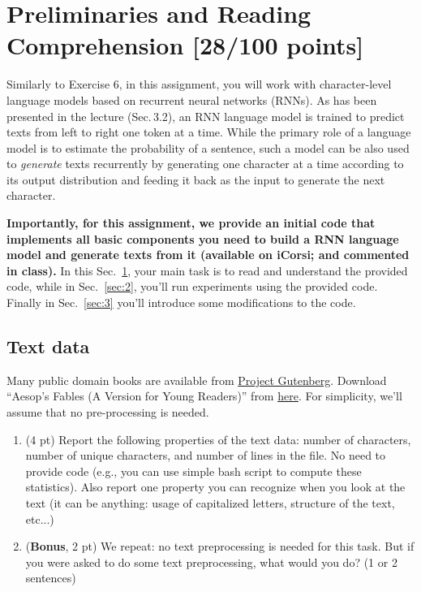 \documentclass[a4paper,11pt]{article}
\begin{document}
\section{Preliminaries and Reading Comprehension [28/100 points]}
\label{sec:1}
Similarly to Exercise 6, in this assignment, you will work with
character-level language models based on recurrent neural networks (RNNs).
As has been presented in the lecture (Sec.\,3.2), an RNN language model is
trained to predict texts from left to right one token at a time.
While the primary role of a language model is to estimate the probability of
a sentence, such a model can be also used to
\textit{generate} texts recurrently by generating one character at a time
according to its output distribution and feeding it back as the input to
generate the next character.

\textbf{Importantly, for this assignment, we provide an initial code that
implements all \mbox{basic} components you need to build a RNN language model and generate texts from it
(available on iCorsi; and commented in class).}
In this Sec.~\ref{sec:1}, your main task is to read and understand the provided code,
while in Sec.~\ref{sec:2}, you'll run experiments using the provided code.
Finally in Sec.~\ref{sec:3} you'll introduce some modifications to the code.

\subsection{Text data}
Many public domain books are available from
\href{http://www.gutenberg.org/}{Project Gutenberg}.
Download ``Aesop's Fables (A Version for Young Readers)''
from \href{http://www.gutenberg.org/files/49010/49010-0.txt}{here}.
For simplicity, we'll assume that no pre-processing is needed.
\begin{enumerate}
 \item (4 pt) Report the following properties of the text data:
 number of characters, number of unique characters, and number of lines in the file. No need to provide code (e.g., you can use simple bash script to compute these statistics).
 Also report one property you can recognize when you look at the text (it can be anything: usage of capitalized letters, structure of the text, etc...)

\item (\textbf{Bonus}, 2 pt) We repeat: no text preprocessing is needed for this task.
But if you were asked to do some text preprocessing, what would you do? (1 or 2 sentences)
\end{enumerate}
\end{document}
